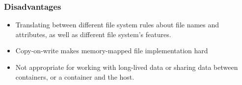 \documentclass{article}
\begin{document}
\subsubsection{Disadvantages}
\begin{itemize}
    \item Translating between different file system rules about file names and attributes, as well as different file system's features. 
    
    \item Copy-on-write makes memory-mapped file implementation hard
    
    \item Not appropriate for working with long-lived data or sharing data between containers, or a container and the host.
\end{itemize}
\end{document}
